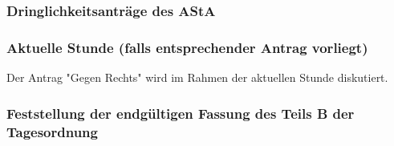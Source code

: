 \documentclass[ngerman,headheight=70pt]{scrartcl}
\begin{document}
    \subsubsection{Dringlichkeitsanträge des AStA}

    \subsubsection{Aktuelle Stunde (falls entsprechender Antrag vorliegt)}

    Der Antrag "Gegen Rechts" wird im Rahmen der aktuellen Stunde diskutiert.

    \subsubsection{Feststellung der endgültigen Fassung des Teils B der Tagesordnung}
\end{document}

